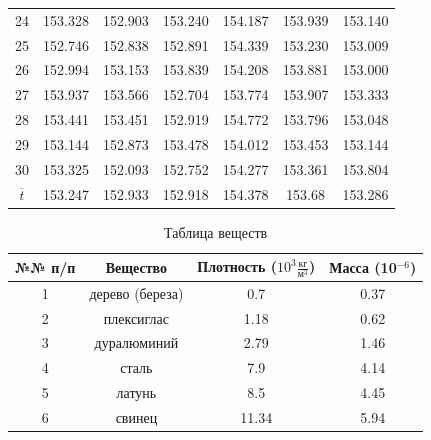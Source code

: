 \begin{center}
\begin{table}[h!]
\begin{tabular}{|c|c|c|c|c|c|c|}
24&153.328&152.903&153.240&154.187&153.939&153.140 \\
25&152.746&152.838&152.891&154.339&153.230&153.009 \\
26&152.994&153.153&153.839&154.208&153.881&153.000 \\
27&153.937&153.566&152.704&153.774&153.907&153.333 \\
28&153.441&153.451&152.919&154.772&153.796&153.048 \\
29&153.144&152.873&153.478&154.012&153.453&153.144 \\
30&153.325&152.093&152.752&154.277&153.361&153.804 \\
\hline
$\overline{t}$&153.247 &152.933 &152.918 & 154.378&153.68&153.286 \\ 
\hline
\end{tabular}
\end{table}
\end{center}

\begin{center}
\begin{table}[h!]
\centering
\caption{Таблица веществ}
\label{tabl:1}
\begin{tabular}{|c|c|c|c|}
\hline
\begin{minipage}{1cm}
    №№ п/п 
\end{minipage} &
    
\begin{minipage}{5cm}
    Вещество
\end{minipage} &
\begin{minipage}{5cm}
    Плотность ($10^3 \frac{\text{кг}}{\text{м}^{3}}$)
\end{minipage} &
 Масса (10$^{-6}$)
\\
\hline
1 & дерево (береза) & 0.7 & 0.37\\
2 & плексиглас & 1.18 & 0.62\\
3 & дуралюминий & 2.79 & 1.46\\
4 & сталь & 7.9 & 4.14\\
5 & латунь & 8.5 & 4.45\\
6 & свинец & 11.34 & 5.94\\
\hline
\end{tabular}
\end{table}
\end{center}

